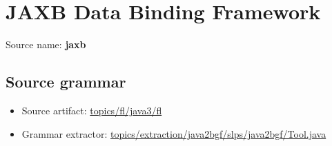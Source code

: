 \chapter{JAXB Data Binding Framework}

 Source name: \textbf{jaxb}

\section{Source grammar}

\begin{itemize}
\item Source artifact: \href{http://github.com/grammarware/slps/blob/master/topics/fl/java3/fl}{topics/fl/java3/fl}
\item Grammar extractor: \href{http://github.com/grammarware/slps/blob/master/topics/extraction/java2bgf/slps/java2bgf/Tool.java}{topics/extraction/java2bgf/slps/java2bgf/Tool.java}
\end{itemize}

